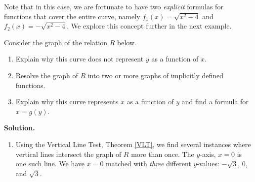 \documentclass{ximera}
\begin{document}
\smallskip

 Note that in this case, we are fortunate to have two \textit{explicit} formulas for functions that cover the entire curve,  namely $f_{1}(x) = \sqrt{x^2-4}$ and $f_{2}(x) = -\sqrt{x^2-4}$.   We explore this concept further in the next example.

\begin{example} \label{implicitfcnex}  Consider the graph of the relation $R$ below.

\begin{enumerate}

\item  Explain why this curve does not represent $y$ as a function of $x$.
\item Resolve the graph of $R$ into two or more graphs of implicitly defined functions.
\item  Explain why this curve represents $x$ as a function of $y$ and find a formula for $x = g(y)$.


\end{enumerate}



\begin{center}

% 

\end{center}


{\bf Solution.}

\begin{enumerate}

\item Using the Vertical Line Test, Theorem \ref{VLT}, we find several instances where vertical lines intersect the graph of $R$ more than once.  The $y$-axis, $x = 0$ is one such line.  We have $x = 0$ matched with \textit{three} different $y$-values:  $-\sqrt{3}$, $0$, and $\sqrt{3}$.


\end{enumerate}
\end{example}
\end{document}
